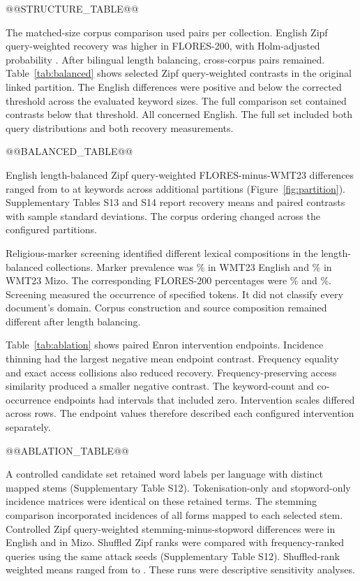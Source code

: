 \documentclass[12pt]{article}
\begin{document}
@@STRUCTURE_TABLE@@

The matched-size corpus comparison used \MatchedPairs{} pairs per collection. English Zipf query-weighted recovery was \MatchedEnglishDifference{} higher in FLORES-200, with Holm-adjusted probability \MatchedEnglishP{}. After bilingual length balancing, \BalancedPairs{} cross-corpus pairs remained. Table~\ref{tab:balanced} shows selected Zipf query-weighted contrasts in the original linked partition. The English differences were positive and below the corrected threshold across the evaluated keyword sizes. The full comparison set contained \BalancedSignificant{} contrasts below that threshold. All concerned English. The full set included both query distributions and both recovery measurements.

@@BALANCED_TABLE@@

English length-balanced Zipf query-weighted FLORES-minus-WMT23 differences ranged from \BalancedSensitivityMin{} to \BalancedSensitivityMax{} at \Keywords{} keywords across additional partitions (Figure~\ref{fig:partition}). Supplementary Tables S13 and S14 report recovery means and paired contrasts with sample standard deviations. The corpus ordering changed across the configured partitions.

Religious-marker screening identified different lexical compositions in the length-balanced collections. Marker prevalence was \WMTMarkerEN{}\% in WMT23 English and \WMTMarkerLUS{}\% in WMT23 Mizo. The corresponding FLORES-200 percentages were \FloresMarkerEN{}\% and \FloresMarkerLUS{}\%. Screening measured the occurrence of specified tokens. It did not classify every document's domain. Corpus construction and source composition remained different after length balancing.

Table~\ref{tab:ablation} shows paired Enron intervention endpoints. Incidence thinning had the largest negative mean endpoint contrast. Frequency equality and exact access collisions also reduced recovery. Frequency-preserving access similarity produced a smaller negative contrast. The keyword-count and co-occurrence endpoints had intervals that included zero. Intervention scales differed across rows. The endpoint values therefore described each configured intervention separately.

@@ABLATION_TABLE@@

A controlled candidate set retained \ControlledKeywords{} word labels per language with distinct mapped stems (Supplementary Table S12). Tokenisation-only and stopword-only incidence matrices were identical on these retained terms. The stemming comparison incorporated incidences of all forms mapped to each selected stem. Controlled Zipf query-weighted stemming-minus-stopword differences were \ENControlledStemZipfDifference{} in English and \LUSControlledStemZipfDifference{} in Mizo. Shuffled Zipf ranks were compared with frequency-ranked queries using the same attack seeds (Supplementary Table S12). Shuffled-rank weighted means ranged from \ShuffledWeightedMin{} to \ShuffledWeightedMax{}. These \SensitivityRuns{} runs were descriptive sensitivity analyses.
\end{document}
